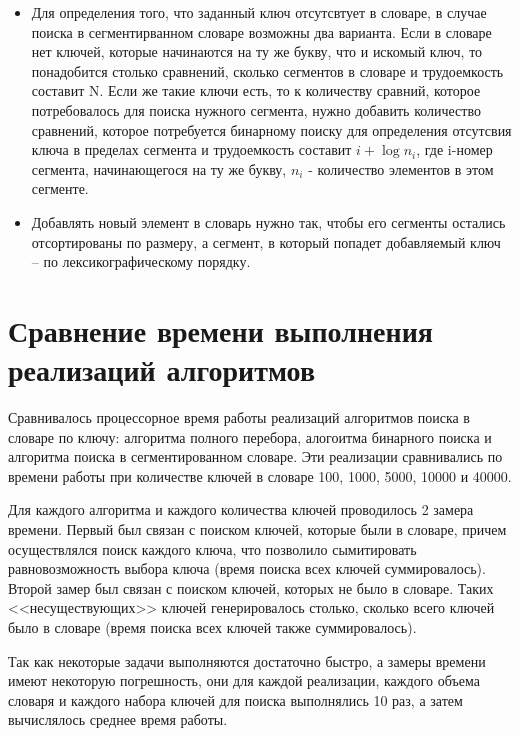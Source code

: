 \begin{itemize}
\begin{itemize}
		\item Для определения того, что заданный ключ отсутсвтует в словаре, в случае поиска в сегментирванном словаре возможны два варианта. Если в словаре нет ключей, которые начинаются на ту же букву, что и искомый ключ, то понадобится столько сравнений, сколько сегментов в словаре и трудоемкость составит N. Если же такие ключи есть, то к количеству сравний, которое потребовалось для поиска нужного сегмента, нужно добавить количество сравнений, которое потребуется бинарному поиску для определения отсутсвия ключа в пределах сегмента и трудоемкость составит $i + \log{n_i}$, где i-номер сегмента, начинающегося на ту же букву, $n_i$ - количество элементов в этом сегменте.
		
		\item Добавлять новый элемент в словарь нужно так, чтобы его сегменты остались отсортированы по размеру, а сегмент, в который попадет добавляемый ключ -- по лексикографическому порядку.
	\end{itemize}

\end{itemize}


\section{Сравнение времени выполнения реализаций алгоритмов}

Сравнивалось процессорное время работы реализаций алгоритмов поиска в словаре по ключу: алгоритма полного перебора, алогоитма бинарного поиска и алгоритма поиска в сегментированном словаре. Эти реализации сравнивались по времени работы при количестве ключей в словаре 100, 1000, 5000, 10000 и 40000.

Для каждого алгоритма и каждого количества ключей проводилось 2 замера времени. Первый был связан с поиском ключей, которые были в словаре, причем осуществлялся поиск каждого ключа, что позволило сымитировать равновозможность выбора ключа (время поиска всех ключей суммировалось). Второй замер был связан с поиском ключей, которых не было в словаре. Таких <<несуществующих>> ключей генерировалось столько, сколько всего ключей было в словаре (время поиска всех ключей также суммировалось).
 
Так как некоторые задачи выполняются достаточно быстро, а замеры времени имеют некоторую погрешность, они для каждой реализации, каждого объема словаря и каждого набора ключей для поиска выполнялись 10 раз, а затем вычислялось среднее время работы.
 

